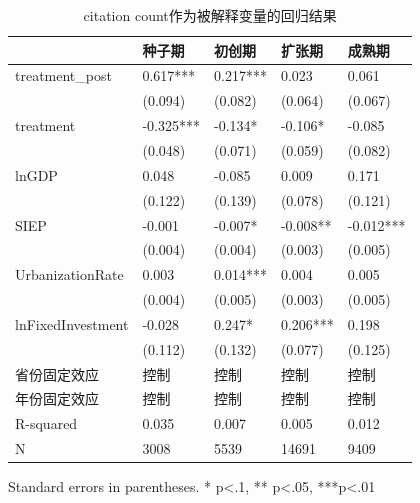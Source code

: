 \begin{table}
\caption{citation count作为被解释变量的回归结果}
\label{}
\begin{center}
\begin{tabular}{lllll}
\hline
                  & 种子期       & 初创期      & 扩张期      & 成熟期        \\
\hline
treatment\_post   & 0.617***  & 0.217*** & 0.023    & 0.061      \\
                  & (0.094)   & (0.082)  & (0.064)  & (0.067)    \\
treatment         & -0.325*** & -0.134*  & -0.106*  & -0.085     \\
                  & (0.048)   & (0.071)  & (0.059)  & (0.082)    \\
lnGDP             & 0.048     & -0.085   & 0.009    & 0.171      \\
                  & (0.122)   & (0.139)  & (0.078)  & (0.121)    \\
SIEP            & -0.001    & -0.007*  & -0.008** & -0.012***  \\
                  & (0.004)   & (0.004)  & (0.003)  & (0.005)    \\
UrbanizationRate              & 0.003     & 0.014*** & 0.004    & 0.005      \\
                  & (0.004)   & (0.005)  & (0.003)  & (0.005)    \\
lnFixedInvestment & -0.028    & 0.247*   & 0.206*** & 0.198      \\
                  & (0.112)   & (0.132)  & (0.077)  & (0.125)    \\
省份固定效应  & 控制 & 控制 & 控制 & 控制  \\ 
 年份固定效应  & 控制 & 控制 & 控制 & 控制  \\ 
\hline

R-squared         & 0.035     & 0.007    & 0.005    & 0.012      \\
N                 & 3008      & 5539     & 14691    & 9409       \\
\hline
\end{tabular}
\end{center}
\end{table}
\bigskip
Standard errors in parentheses. \newline 
* p<.1, ** p<.05, ***p<.01

